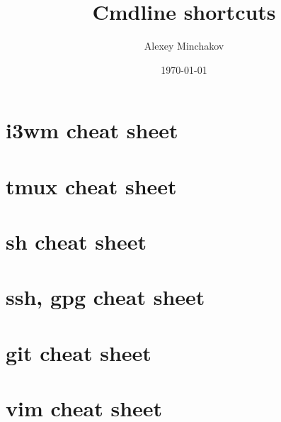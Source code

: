 \documentclass[a4paper, 12pt]{article}
\title{Cmdline shortcuts}
\author{Alexey Minchakov}
\date{\today}
\begin{document}

\section{i3wm cheat sheet}


\pagebreak
\section{tmux cheat sheet}


\pagebreak
\section{sh cheat sheet}

\pagebreak
\section{ssh, gpg cheat sheet}

\pagebreak
\section{git cheat sheet}


\pagebreak
\section{vim cheat sheet}

\end{document}
